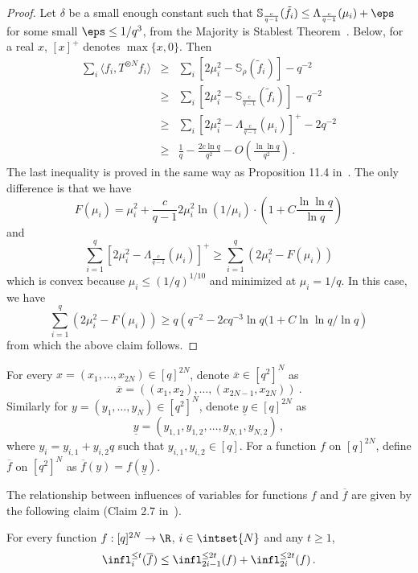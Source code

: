 \begin{proof}
  Let $\delta$ be a small enough constant such that
  $\mathbb{S}_{\frac{c}{q-1}}(\tilde{f}_i) \le
  \Lambda_{\frac{c}{q-1}}(\mu_i)+\eps$ for some small $\eps\le
  {1}/{q^3}$, from the Majority is Stablest Theorem~\cite{MOO}.
  Below, for a real $x$, $[x]^+$ denotes $\max \{ x, 0\}$. Then
  \begin{eqnarray*}
    \sum_i \langle f_i, T^{\otimes N} f_i\rangle &\ge& \sum_i \left[2 \mu_i^2
      - \mathbb{S}_{\rho}(\tilde{f}_i)\right]  - q^{-2}\\
    &\ge& \sum_i \left[2 \mu_i^2 - \mathbb{S}_{\frac{c}{q-1}}(\tilde{f}_i)\right]  -
    q^{-2}\\
    &\ge& \sum_i \left[2 \mu_i^2 - \Lambda_{\frac{c}{q-1}}(\mu_i)\right]^+-2 q^{-2}\\
    &\ge& \frac{1}{q} - \frac{2 c \ln q}{q^2} - O\left(\frac{\ln\ln q}{q^2}\right)\,.
  \end{eqnarray*}
  The last inequality is proved in the same way as Proposition 11.4 in~\cite{KKMO}. The only difference is that we have
  \[ F(\mu_i) = \mu_i^2 + \frac{c}{q-1} 2 \mu_i^2 \ln(1/\mu_i)\cdot
  \left(1+C\frac{\ln\ln q}{\ln q}\right)\]
  and
  \[ \sum_{i=1}^q \left[ 2 \mu_i^2 -
    \Lambda_{\frac{c}{q-1}}(\mu_i)\right]^+ \ge \sum_{i=1}^q (2\mu_i^2
  - F(\mu_i))\] which is convex because $\mu_i\le (1/q)^{1/10}$ and
  minimized at $\mu_i=1/q$. In this case, we have
  \[ \sum_{i=1}^q (2\mu_i^2 - F(\mu_i)) \ge q\left(q^{-2} - 2 c q^{-3}
    \ln q (1 + C \ln \ln q / \ln q\right)\] from which the above claim
  follows.
\end{proof}

%
\begin{definition}
  For every $x=(x_1,\ldots,x_{2 N}) \in [q]^{2 N}$, denote
  $\overline{x} \in [q^2]^N$ as
\[ \overline{x} = ((x_1, x_2),\ldots,(x_{2 N-1},x_{2 N})) \ . \]
  Similarly for $y=(y_1,\ldots,y_{N}) \in [q^2]^{N}$, denote
  $\underline{y} \in [q]^{2 N}$ as
  \[ \underline{y} = (y_{1,1}, y_{1,2},\ldots,y_{N,1},y_{N,2})\,,\]
  where $y_i = y_{i,1} + y_{i,2} q$ such that $y_{i,1},y_{i,2}\in
  [q]$.  For a function $f$ on $[q]^{2 N}$, define $\overline{f}$ on
  $[q^2]^N$ as $\overline{f}(y) = f(\underline{y})$. 
%
\end{definition}
%
\noindent 
The relationship between influences of variables for functions $f$ and
$\overline{f}$ are given by the following claim (Claim 2.7 in~\cite{DMR}).
%
\begin{claim}\label{claim:infrel}
  For every function $f:[q]^{2N}\rightarrow \R$,
  $i\in\intset{N}$ and any $t\ge 1$,
  \[\infl_i^{\le t}(\overline{f}) \le \infl_{2i-1}^{\le 2t}(f) +
  \infl_{2i}^{\le 2t} (f)\,.\]
\end{claim}

